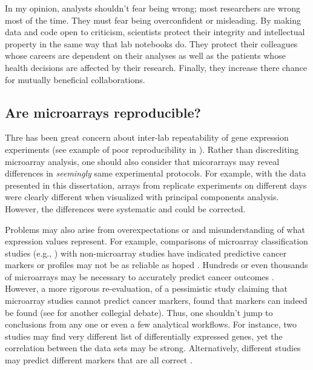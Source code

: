 In my opinion, analysts shouldn't fear being wrong; most researchers
are wrong most of the time. They must fear being overconfident or misleading. 
By making data and code open to criticism,
scientists protect their integrity and intellectual property in the same
way that lab notebooks do. They protect their colleagues
whose careers are dependent on their analyses as well as the patients
whose health decisions are affected by their research.
Finally, they increase there chance for mutually beneficial collaborations.

\subsection{Are microarrays reproducible?}

Thre has been great concern about inter-lab repeatability of 
gene expression experiments
(see example of poor reproducibility in 
\cite{Evsikov:2003ic,Fortunel:2003eu,Ivanova:2003bh,RamalhoSantos:2002dy}). 
Rather than discrediting microarray analysis,
one should also consider that micorarrays
may reveal differences in \textit{seemingly} same experimental protocols.
For example, with the data presented in this dissertation, arrays from
replicate experiments on different days were clearly different when
visualized with principal components analysis. However, the differences
were systematic and could be corrected.

Problems may also arise from overexpectations or and misunderstanding 
of what expression values represent. 
For example, comparisons of microarray classification
studies (e.g., \cite{Veer:2002vv,Yeoh:2002wg,Alizadeh:2000tn,Golub:1999fn,
Perou:1999fr,Wang:2005uu,VanDeVijver:2002wj,Rosenwald:2002eg,Beer:2002uy,
Bhattacharjee:2001dt,Ramaswamy:2003to,Pomeroy:2002wx,Iizuka:2003wo})
with non-microarray studies have indicated predictive cancer markers or profiles
may not be as reliable as hoped \cite{Miklos:2004wn,Michiels:2007vs,Koscielny:2010gg,Eden:2004ua}.
Hundreds or even thousands of microarrays may be necessary to
accurately predict cancer 
outcomes \cite{Ioannidis:2005kd,Michiels:2005tg,EinDor:2006ga,Frantz:2005ur}.
However, a more rigorous re-evaluation, of a pessimistic study claiming
that microarray studies cannot predict cancer markers, found that
markers can indeed be found (see \cite{Michiels:2005tg,Fan:2010cv,Tong:2010ka,Koscielny:2010jd}
for another collegial debate).
Thus, one shouldn't jump to conclusions from any one or even a few
analytical workflows.
For instance, two studies may find very different
list of differentially expressed genes, yet the correlation
between the data sets may be strong. Alternatively, different studies may
predict different markers that are all correct \cite{Zhang:2008bk,Zhang:2009cy}.

